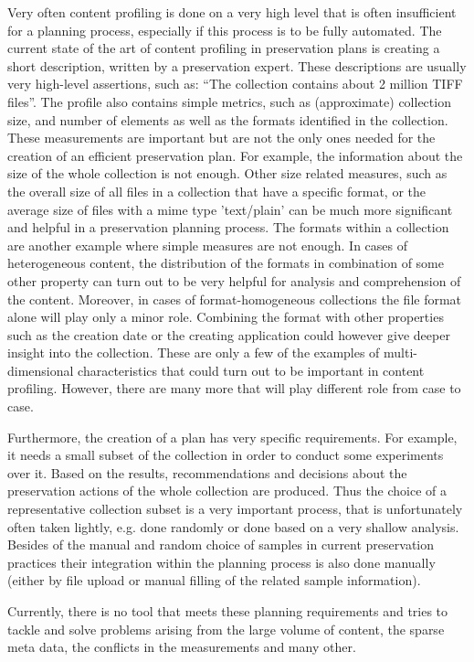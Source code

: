 Very often content profiling is done on a very high level that is often insufficient for a planning process, especially if this process is to be fully automated.
The current state of the art of content profiling in preservation plans is creating a short description, written by a preservation expert.
These descriptions are usually very high-level assertions, such as: ``The collection contains about 2 million TIFF files''. 
The profile also contains simple metrics, such as (approximate) collection size, and number of elements as well as the formats identified in the collection. 
These measurements are important but are not the only ones needed for the creation of an efficient preservation plan.
For example, the information about the size of the whole collection is not enough.
Other size related measures, such as the overall size of all files in a collection that have a specific format, or the average size of files with a mime type 'text/plain' can be much more significant and helpful in a preservation planning process.
The formats within a collection are another example where simple measures are not enough.
In cases of heterogeneous content, the distribution of the formats in combination of some other property can turn out to be very helpful for analysis and comprehension of the content.
Moreover, in cases of format-homogeneous collections the file format alone will play only a minor role.
Combining the format with other properties such as the creation date or the creating application could however give deeper insight into the collection.
These are only a few of the examples of multi-dimensional characteristics that could turn out to be important in content profiling.
However, there are many more that will play different role from case to case.

Furthermore, the creation of a plan has very specific requirements.
For example, it needs a small subset of the collection in order to conduct some experiments over it.
Based on the results, recommendations and decisions about the preservation actions of the whole collection are produced.
Thus the choice of a representative collection subset is a very important process, that is unfortunately often taken lightly, e.g. done randomly or done based on a very shallow analysis.
Besides of the manual and random choice of samples in current preservation practices their integration within the planning process is also done manually (either by file upload or manual filling of the related sample information).

Currently, there is no tool that meets these planning requirements and tries to tackle and solve problems arising from the large volume of content, the sparse meta data, the conflicts in the measurements and many other.


